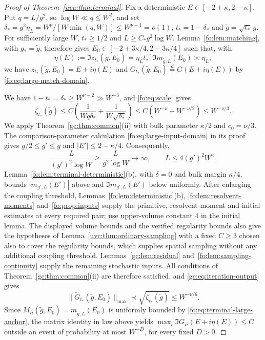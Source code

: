 \documentclass[11pt]{article}
\numberwithin{equation}{section}
\theoremstyle{remark}
\newcommand{\wt}{\widetilde}
\begin{document}
\begin{proof}[Proof of Theorem~\ref{uvu:thm:terminal}]
Fix a deterministic $E\in[-2+\kappa,2-\kappa]$. Put $q=L/g^2$, so
$\log W\ll q\le W^2$, and set
$\delta_*=g^2\eta_L=W^\nu/[W\min(q,W)]\le W^{\nu-1}=o(1)$,
$t_*=1-\delta_*$ and $\widetilde g=\sqrt{t_*}\,g$.
For sufficiently large $W$, $t_*\ge1/2$ and $L\ge C_*g^2\log W$.
Lemma~\ref{fo:lem:matching}, with $g_*=\widetilde g$, therefore gives
$E_0\in[-2+3\kappa/4,2-3\kappa/4]$ such that, with
\[
 \eta(E):=\Im z_{t_*}(\widetilde g,E_0)
 =\eta_Lt_*^{-1}\Im m_{\widetilde g,L}(E_0)\asymp\eta_L,
\]
we have $z_{t_*}(\widetilde g,E_0)=E+i\eta(E)$ and
$G_{t_*}(\widetilde g,E_0)\stackrel d=G(E+i\eta(E))$
by \eqref{fo:eq:large-match-domain}.

We have $1-t_*=\delta_*\ge W^{\nu-2}\gg W^{-3}$, and
\eqref{fo:eq:scale} gives
\[
 \zeta_{t_*}(\widetilde g)
 \le C\left(\frac1{Wq\delta_*}+\frac1{W\sqrt{\delta_*}}\right)
 \le C(W^{-\nu}+W^{-\nu/2})\le W^{-\nu/3}.
\]
We apply Theorem~\ref{gc:thm:common}(ii) with bulk parameter $\kappa/2$
and $c_0=\nu/3$.
The comparison-parameter calculation \eqref{fo:eq:large-input-domain}
in its proof gives $g/2\le g'\le g$ and $|E'|\le2-\kappa/4$.
Consequently,
\[
 \frac{L}{(g')^2\log W}\ge\frac{L}{g^2\log W}\longrightarrow\infty,
 \qquad L\le4(g')^2W^2.
\]
Lemma~\ref{fo:lem:terminal-deterministic}(b), with $\delta=0$ and
bulk margin $\kappa/4$, bounds $|m_{g',L}(E')|$ above and
$\Im m_{g',L}(E')$ below uniformly.
After enlarging the coupling threshold, Lemmas~\ref{fo:lem:deterministic}(b),
\ref{fo:lem:resolvent-moments} and~\ref{fo:prop:inputs} supply the primitive,
resolvent-moment and initial estimates at every required pair; use
upper-volume constant $4$ in the initial lemma.
The displayed volume bounds and the verified regularity bounds also
give the hypotheses of Lemma~\ref{uvc:thm:ordinary-sampling} with a fixed
$C\ge3$ chosen also to cover the regularity bounds,
which supplies spatial sampling without any additional coupling threshold.
Lemmas~\ref{gc:lem:residual} and~\ref{fo:lem:sampling-continuity}
supply the remaining stochastic inputs.
All conditions of Theorem~\ref{gc:thm:common}(ii) are therefore satisfied,
and \eqref{gc:eq:iteration-output} gives
\begin{equation}\label{uvu:eq:terminal-law}
 \|\wt G_{t_*}(\widetilde g,E_0)\|_{\max}
 \prec\sqrt{\zeta_{t_*}(\widetilde g)}\le W^{-\nu/6}.
\end{equation}
Since $M_{ii}(\widetilde g,E_0)=m_{\widetilde g,L}(E_0)$ is uniformly
bounded by \eqref{fo:eq:terminal-large-anchor}, the matrix identity in law
above yields $\max_i\Im G_{ii}(E+i\eta(E))\le C$ outside an event
of probability at most $W^{-D}$, for every fixed $D>0$.


\end{proof}
\end{document}
